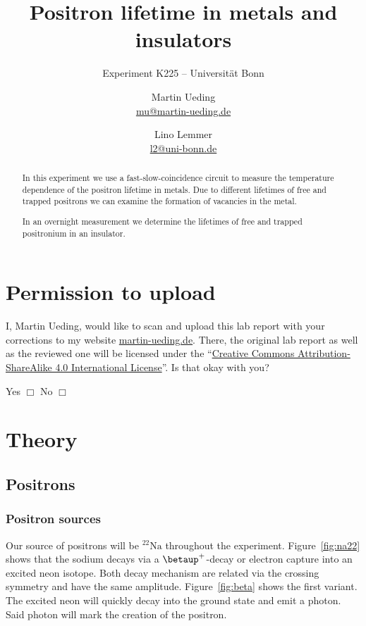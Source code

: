 \documentclass[11pt, english, fleqn, DIV=15, headinclude, BCOR=2cm]{scrreprt}
\title{Positron lifetime in metals and insulators}
\subtitle{Experiment K225 -- Universität Bonn}
\author{%
    Martin Ueding \\
    \small{\href{mailto:mu@martin-ueding.de}{mu@martin-ueding.de}}
    \and
    Lino Lemmer \\
    \small{\href{mailto:l2@uni-bonn.de}{l2@uni-bonn.de}}
}
\date{\daterange{2016-03-24}{2016-03-25}}
\begin{document}
\maketitle

\begin{abstract}
        In this experiment we use a fast-slow-coincidence circuit to measure
        the temperature dependence of the positron lifetime in metals. Due to
        different lifetimes of free and trapped positrons we can examine the
        formation of vacancies in the metal. 
        
        In an overnight measurement we determine the lifetimes of free and
        trapped positronium in an insulator. 
\end{abstract}

\tableofcontents

\chapter*{Permission to upload}

I, Martin Ueding, would like to scan and upload this lab report with your
corrections to my website \href{http://martin-ueding.de}{martin-ueding.de}.
There, the original lab report as well as the reviewed one will be licensed
under the “\href{http://creativecommons.org/licenses/by-sa/4.0/}{Creative
Commons Attribution-ShareAlike 4.0 International License}”. Is that okay with
you?

Yes $\Box$ \hspace{2cm} No $\Box$

\chapter{Theory}

\section{Positrons}

\subsection{Positron sources}

Our source of positrons will be $\mathrm{^{22}Na}$ throughout the experiment.
Figure~\ref{fig:na22} shows that the sodium decays via a $\betaup^+$-decay or
electron capture into an excited neon isotope. Both decay mechanism are related
via the crossing symmetry and have the same amplitude. Figure~\ref{fig:beta}
shows the first variant. The excited neon will quickly decay into the ground
state and emit a photon. Said photon will mark the creation of the positron.
\end{document}
